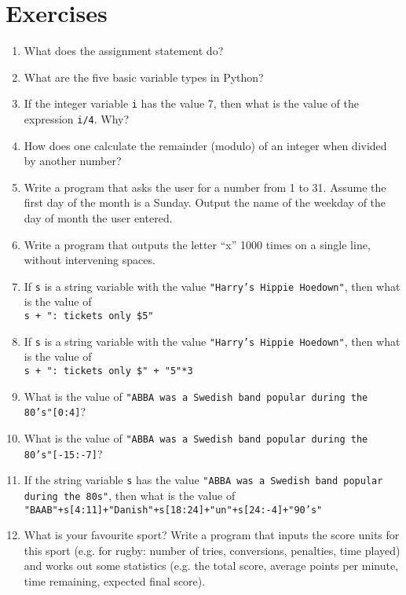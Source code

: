 \section{Exercises}
\begin{enumerate}
	\item What does the assignment statement do?
	\item What are the five basic variable types in Python?
	\item If the integer variable \texttt{i} has the value 7, then what is    the value of the expression 
\texttt{i/4}. Why?
	\item How does one calculate the remainder (modulo) of an integer when    divided by another number?
	\item Write a program that asks the user for a number from 1 to 31.    Assume the first day of the month is a Sunday. Output the name of    the weekday of the day of month the user entered.
	\item Write a program that outputs the letter ``x'' 1000 times on a    single line, without intervening spaces.
	\item If \texttt{s} is a string variable with the value \texttt{"Harry's Hippie Hoedown"}, then what is the value of
\\
\texttt{s + ": tickets only    \$5"}
	\item If \texttt{s} is a string variable with the value \texttt{"Harry's Hippie Hoedown"}, then what is the value of
\\
\texttt{s + ": tickets only    \$" + "5"*3}
	\item What is the value of 
\texttt{"ABBA was a Swedish band popular during the    80's"[0:4]}?
	\item What is the value of 
\texttt{"ABBA was a Swedish band popular during the    80's"[-15:-7]}?
	\item If the string variable \texttt{s} has the value \texttt{"ABBA was a    Swedish band popular during the 80s"}, then what is the value of    
\\
\texttt{"BAAB"+s[4:11]+"Danish"+s[18:24]+"un"+s[24:-4]+"90's"}
	\item What is your favourite sport? Write a program that inputs the score       units for this sport (e.g. for rugby: number of tries, conversions,       penalties, time played) and works out some statistics (e.g. the total       score, average points per minute, time remaining, expected final score).    
\end{enumerate} 
